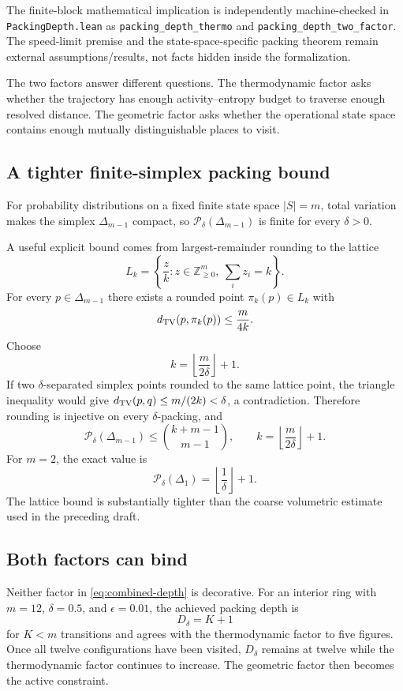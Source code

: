 \documentclass[11pt,a4paper]{article}
\theoremstyle{definition}
\numberwithin{equation}{section}
\begin{document}
The finite-block mathematical implication is independently machine-checked in
\texttt{PackingDepth.lean} as
\texttt{packing\_depth\_thermo} and
\texttt{packing\_depth\_two\_factor}. The speed-limit premise and the
state-space-specific packing theorem remain external assumptions/results, not
facts hidden inside the formalization.

The two factors answer different questions. The thermodynamic factor asks
whether the trajectory has enough activity--entropy budget to traverse enough
resolved distance. The geometric factor asks whether the operational state
space contains enough mutually distinguishable places to visit.

\subsection*{A tighter finite-simplex packing bound}

For probability distributions on a fixed finite state space $|S|=m$, total
variation makes the simplex $\Delta_{m-1}$ compact, so
$\mathcal P_\delta(\Delta_{m-1})$ is finite for every $\delta>0$.

A useful explicit bound comes from largest-remainder rounding to the lattice
\[
L_k
=
\left\{
\frac{z}{k}:
z\in\mathbb Z_{\ge0}^{m},
\ \sum_i z_i=k
\right\}.
\]
For every $p\in\Delta_{m-1}$ there exists a rounded point
$\pi_k(p)\in L_k$ with
\[
d_{\rm TV}(p,\pi_k(p))
\le
\frac{m}{4k}.
\]
Choose
\[
k=
\left\lfloor\frac{m}{2\delta}\right\rfloor+1.
\]
If two $\delta$-separated simplex points rounded to the same lattice point,
the triangle inequality would give
$d_{\rm TV}(p,q)\le m/(2k)<\delta$, a contradiction. Therefore rounding is
injective on every $\delta$-packing, and
\begin{equation}
\boxed{
\mathcal P_\delta(\Delta_{m-1})
\le
\binom{k+m-1}{m-1},
\qquad
k=
\left\lfloor\frac{m}{2\delta}\right\rfloor+1.
}
\label{eq:simplex-packing}
\end{equation}
For $m=2$, the exact value is
\[
\mathcal P_\delta(\Delta_1)
=
\left\lfloor\frac1\delta\right\rfloor+1.
\]
The lattice bound is substantially tighter than the coarse volumetric
estimate used in the preceding draft.

\subsection*{Both factors can bind}

Neither factor in \eqref{eq:combined-depth} is decorative. For an interior
ring with $m=12$, $\delta=0.5$, and $\epsilon=0.01$, the achieved packing depth
is
\[
D_\delta=K+1
\]
for $K<m$ transitions and agrees with the thermodynamic factor to five
figures. Once all twelve configurations have been visited, $D_\delta$ remains
at twelve while the thermodynamic factor continues to increase. The geometric
factor then becomes the active constraint.
\end{document}
